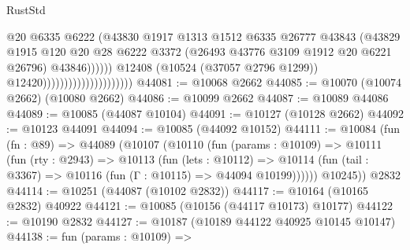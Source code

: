 \begin{lexlean}{RustStd}
\begin{coremodule}
                                                      @20
                                                      @6335
                                                      @6222
                                                      (@43830
                                                        @1917
                                                        @1313
                                                        @1512
                                                        @6335
                                                        @26777
                                                        @43843
                                                        (@43829
                                                          @1915
                                                          @120
                                                          @20
                                                          @28
                                                          @6222
                                                          @3372
                                                          (@26493
                                                            @43776
                                                            @3109
                                                            @1912
                                                            @20
                                                            @6221
                                                            @26796)
                                                          @43846))))))
                                              @12408
                                              (@10524 (@37057 @2796 @1299))
                                              @12420)))))))))))))))))))))
@44081 := @10068 @2662
@44085 := @10070 (@10074 @2662) (@10080 @2662)
@44086 := @10099 @2662
@44087 := @10089 @44086
@44089 := @10085 (@44087 @10104)
@44091 := @10127 (@10128 @2662)
@44092 := @10123 @44091
@44094 := @10085 (@44092 @10152)
@44111 := @10084
    (fun (fn : @89) =>
    @44089
      (@10107
        (@10110
          (fun (params : @10109) =>
          @10111
            (fun (rty : @2943) =>
            @10113
              (fun (lets : @10112) =>
              @10114 (fun (tail : @3367) => @10116 (fun (Γ : @10115) => @44094 @10199))))))
        @10245))
    @2832
@44114 := @10251 (@44087 (@10102 @2832))
@44117 := @10164 (@10165 @2832) @40922
@44121 := @10085 (@10156 (@44117 @10173) @10177)
@44122 := @10190 @2832
@44127 := @10187 (@10189 @44122 @40925 @10145 @10147)
@44138 := fun (params : @10109) =>

\end{coremodule}
\end{lexlean}
